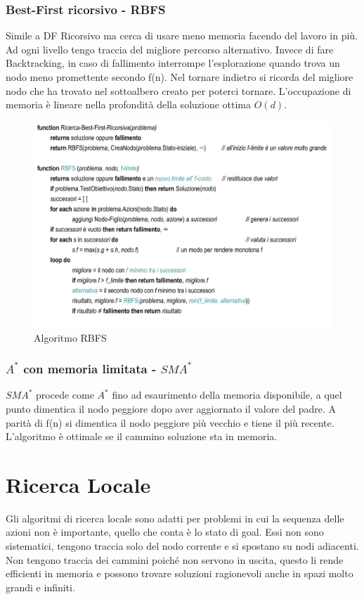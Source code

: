 \documentclass{article}
\begin{document}
\subsubsection{Best-First ricorsivo - RBFS}
Simile a DF Ricorsivo ma cerca di usare meno memoria facendo del lavoro in più. Ad ogni livello tengo traccia del migliore percorso alternativo. Invece di fare Backtracking, in caso di fallimento interrompe l'esplorazione quando trova un nodo meno promettente secondo f(n). Nel tornare indietro si ricorda del migliore nodo che ha trovato nel sottoalbero creato per poterci tornare. L'occupazione di memoria è lineare nella profondità della soluzione ottima $O(d)$.
\begin{figure}[H]
    \centering
    \includegraphics[scale=0.4]{Images/BestfirstRic.png}
    \caption{Algoritmo RBFS}
\end{figure}

\subsubsection{$A^*$ con memoria limitata - $SMA^*$}
$SMA^*$ procede come $A^*$ fino ad esaurimento della memoria disponibile, a quel punto dimentica il nodo peggiore dopo aver aggiornato il valore del padre. A parità di f(n) si dimentica il nodo peggiore più vecchio e tiene il più recente. L'algoritmo è ottimale se il cammino soluzione sta in memoria.

\clearpage

\section{Ricerca Locale}
Gli algoritmi di ricerca locale sono adatti per problemi in cui la sequenza delle azioni non è importante, quello che conta è lo stato di goal. Essi non sono sistematici, tengono traccia solo del nodo corrente e si spostano su nodi adiacenti. Non tengono traccia dei cammini poiché non servono in uscita, questo li rende efficienti in memoria e possono trovare soluzioni ragionevoli anche in spazi molto grandi e infiniti. 
\end{document}
